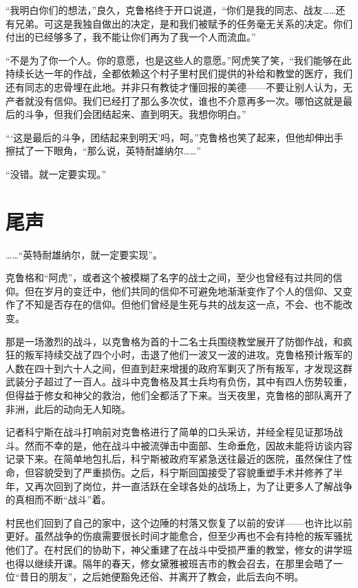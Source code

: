 “我明白你们的想法，”良久，克鲁格终于开口说道，“你们是我的同志、战友……还有兄弟。可这是我独自做出的决定，是和我们被赋予的任务毫无关系的决定。你们付出的已经够多了，我不能让你们再为了我一个人而流血。”

“不是为了你一个人。你的意愿，也是这些人的意愿。”阿虎笑了笑，“我们能够在此持续长达一年的作战，全都依赖这个村子里村民们提供的补给和教堂的医疗，我们还有同志的忠骨埋在此地。并非只有教徒才懂回报的美德——不要让别人认为，无产者就没有信仰。我们已经打了那么多次仗，谁也不介意再多一次。哪怕这就是最后的斗争，但我们会团结起来、直到明天。我想你明白。”

“‘这是最后的斗争，团结起来到明天’吗，呵。”克鲁格也笑了起来，但他却伸出手擦拭了一下眼角，“那么说，英特耐雄纳尔……”

“没错。就一定要实现。”



\section{尾声}

……“英特耐雄纳尔，就一定要实现”。

克鲁格和“阿虎”，或者这个被模糊了名字的战士之间，至少也曾经有过共同的信仰。但在岁月的变迁中，他们共同的信仰不可避免地渐渐变作了个人的信仰、又变作了不知是否存在的信仰。但他们曾经是生死与共的战友这一点，不会、也不能改变。

那是一场激烈的战斗，以克鲁格为首的十二名士兵围绕教堂展开了防御作战，和疯狂的叛军持续交战了四个小时，击退了他们一波又一波的进攻。克鲁格预计叛军的人数在四十到六十人之间，但直到赶来增援的政府军剿灭了所有叛军，才发现这群武装分子超过了一百人。战斗中克鲁格及其士兵均有负伤，其中有四人伤势较重，但得益于修女和神父的救治，他们全都活了下来。当天夜里，克鲁格的部队离开了非洲，此后的动向无人知晓。

记者科宁斯在战斗打响前对克鲁格进行了简单的口头采访，并经全程见证那场战斗。然而不幸的是，他在战斗中被流弹击中面部、生命垂危，因故未能将访谈内容记录下来。在简单地包扎后，科宁斯被政府军紧急送往最近的医院，虽然保住了性命，但容貌受到了严重损伤。之后，科宁斯回国接受了容貌重塑手术并修养了半年，又再次回到了岗位，并一直活跃在全球各处的战场上，为了让更多人了解战争的真相而不断“战斗”着。

村民也们回到了自己的家中，这个边陲的村落又恢复了以前的安详——也许比以前更好。虽然战争的伤痕需要很长时间才能愈合，但至少再也不会有持枪的叛军骚扰他们了。在村民们的协助下，神父重建了在战斗中受损严重的教堂，修女的讲学班也得以继续开课。隔年的春天，修女黛雅被班吉市的教会召去，在那里会晤了一位“昔日的朋友”，之后她便豁免还俗、并离开了教会，此后去向不明。

